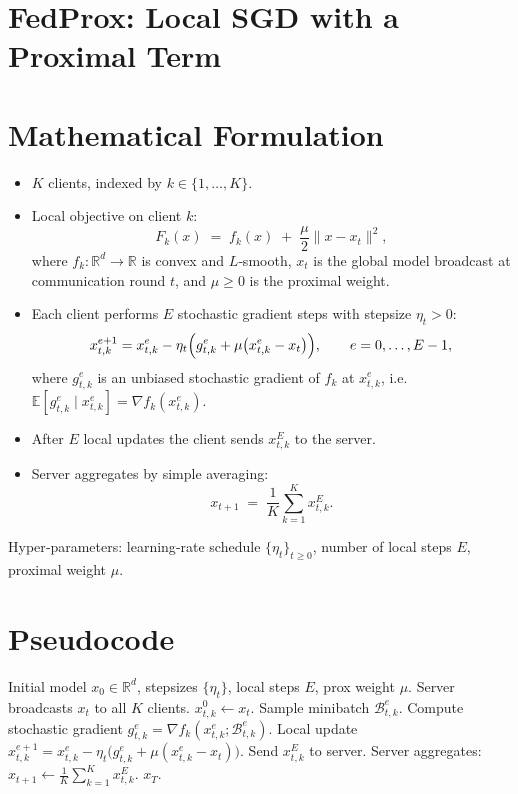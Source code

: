 \documentclass{article}
\newcommand{\E}{\mathbb{E}}
\newcommand{\R}{\mathbb{R}}
\begin{document}
\section*{FedProx: Local SGD with a Proximal Term}

\section*{Mathematical Formulation}
\begin{itemize}
    \item $K$ clients, indexed by $k\in\{1,\dots,K\}$.
    \item Local objective on client $k$:
    \[
        F_k(x)\;=\;f_k(x)\;+\;\frac{\mu}{2}\|x-x_t\|^2,
    \]
    where $f_k:\R^d\!\to\!\R$ is convex and $L$‑smooth, $x_t$ is the global model
    broadcast at communication round $t$, and $\mu\ge 0$ is the proximal weight.
    \item Each client performs $E$ stochastic gradient steps with stepsize $\eta_t>0$:
    \[
        x_{t,k}^{e+1}=x_{t,k}^{e}-\eta_t\Bigl(g_{t,k}^{e}
        +\mu\bigl(x_{t,k}^{e}-x_t\bigr)\Bigr),\qquad e=0,\dots,E-1,
    \]
    where $g_{t,k}^{e}$ is an unbiased stochastic gradient of $f_k$ at $x_{t,k}^{e}$,
    i.e. $\E[g_{t,k}^{e}\mid x_{t,k}^{e}]=\nabla f_k(x_{t,k}^{e})$.
    \item After $E$ local updates the client sends $x_{t,k}^{E}$ to the server.
    \item Server aggregates by simple averaging:
    \[
        x_{t+1}\;=\;\frac{1}{K}\sum_{k=1}^{K}x_{t,k}^{E}.
    \]
\end{itemize}
Hyper‑parameters: learning‑rate schedule $\{\eta_t\}_{t\ge0}$, number of local steps $E$, proximal weight $\mu$.

\section*{Pseudocode}
\begin{algorithm}[H]
\caption{FedProx}
\begin{algorithmic}[1]
\REQUIRE Initial model $x_0\in\R^d$, stepsizes $\{\eta_t\}$, local steps $E$, prox weight $\mu$.
    \STATE Server broadcasts $x_t$ to all $K$ clients.
        \STATE $x_{t,k}^{0}\gets x_t$.
            \STATE Sample minibatch $\mathcal{B}_{t,k}^{e}$.
            \STATE Compute stochastic gradient 
            $g_{t,k}^{e}=\nabla f_k(x_{t,k}^{e};\mathcal{B}_{t,k}^{e})$.
            \STATE Local update 
            $x_{t,k}^{e+1}=x_{t,k}^{e}-\eta_t\bigl(g_{t,k}^{e}
                +\mu(x_{t,k}^{e}-x_t)\bigr)$.
        \ENDFOR
        \STATE Send $x_{t,k}^{E}$ to server.
    \ENDFOR
    \STATE Server aggregates: $x_{t+1}\gets\frac1K\sum_{k=1}^{K}x_{t,k}^{E}$.
\ENDFOR
\RETURN $x_T$.
\end{algorithmic}
\end{algorithm}
\end{document}
